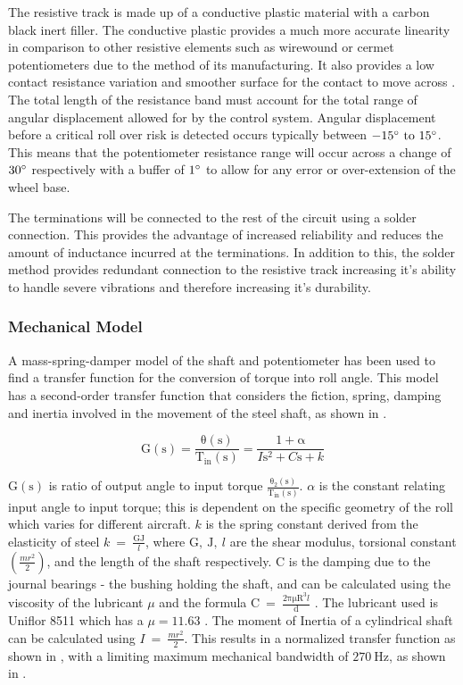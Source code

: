 \documentclass[10pt,twocolumn]{witseiepaper}
\begin{document}
The resistive track is made up of a conductive plastic material with a carbon black inert filler. The conductive plastic provides a much more accurate linearity in comparison to other resistive elements such as wirewound or cermet potentiometers due to the method of its manufacturing. It also provides a low contact resistance variation and smoother surface for the contact to move across \cite{handbook}. The total length of the resistance band must account for the total range of angular displacement allowed for by the control system. Angular displacement before a critical roll over risk is detected occurs typically between $-15 ^\circ \mathrm{~to~} 15 ^\circ $. This means that the potentiometer resistance range will occur across a change of $ 30 ^\circ$ respectively with a buffer of $1 ^\circ $ to allow for any error or over-extension of the wheel base. 

The terminations will be connected to the rest of the circuit using a solder connection. This provides the advantage of increased reliability and reduces the amount of inductance incurred at the terminations. In addition to this, the solder method provides redundant connection to the resistive track increasing it's ability to handle severe vibrations and therefore increasing it's durability.
 
\subsubsection{Mechanical Model}

A mass-spring-damper model of the shaft and potentiometer has been used to find a transfer function for the conversion of torque into roll angle. This model has a second-order transfer function that considers the fiction, spring, damping and inertia involved in the movement of the steel shaft, as shown in .

\begin{equation}
\mathrm{G(s) = \frac{\theta(s)}{T_{in}(s)} = \frac{1 + \alpha}{\textit{I}s^2 + \textit{C}s + \textit{k}} }
\label{mech_model}
\end{equation}

$\mathrm{G(s)}$ is ratio of output angle to input torque $\mathrm{\frac{\theta_2(s)}{T_{in}(s)}}$. $\alpha$ is the constant relating input angle to input torque; this is dependent on the specific geometry of the roll which varies for different aircraft. $k$ is the spring constant derived from the elasticity of steel $k\mathrm{~=~\frac{GJ}{\textit{l}}}$, where $\mathrm{G,~J,~\textit{l}}$ are the shear modulus, torsional constant $(\frac{mr^2}{2})$, and the length of the shaft respectively. $\mathrm{C}$ is the damping due to the journal bearings - the bushing holding the shaft, and can be calculated using the viscosity of the lubricant $\mu$ and the formula $\mathrm{C~=~\frac{2\pi\mu R^3 \textit{l}}{d}}$ \cite{vibrations}. The lubricant used is Uniflor 8511 which has a $\mu = 11.63$ \cite{uniflor}. The moment of Inertia of a cylindrical shaft can be calculated using $I~=~\frac{mr^2}{2}$. This results in a normalized transfer function as shown in , with a limiting maximum mechanical bandwidth of $270~\mathrm{Hz}$, as shown in .
\end{document}
